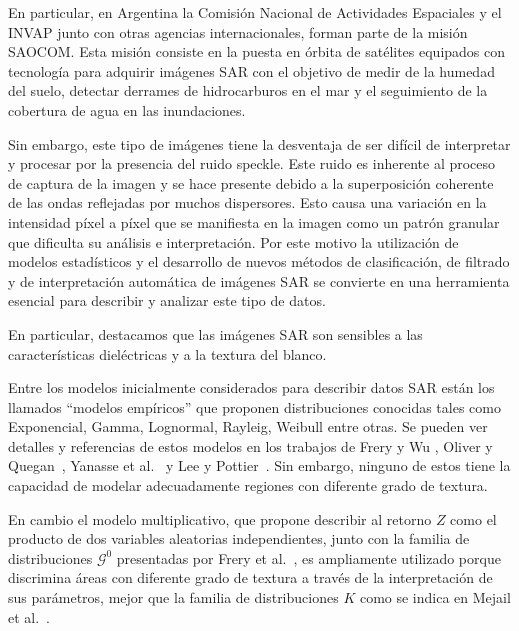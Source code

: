 \documentclass[11pt]{article}
\begin{document}
En particular, en Argentina la Comisión Nacional de Actividades Espaciales y el INVAP junto con otras agencias internacionales, forman parte de la misión SAOCOM. Esta misión consiste en la puesta en órbita de satélites equipados con tecnología para adquirir imágenes SAR con el objetivo de medir de la humedad del suelo, detectar derrames de hidrocarburos en el mar y el seguimiento de la cobertura de agua en las inundaciones. 


Sin embargo, este tipo de imágenes tiene la desventaja de ser difícil de interpretar y procesar por la presencia del ruido speckle. 
Este ruido es inherente al proceso de captura de la imagen y se hace presente debido a la superposición coherente de las ondas reflejadas por muchos dispersores. Esto causa una variación en la intensidad píxel a píxel que se manifiesta en la imagen como un patrón granular que dificulta su análisis e interpretación. 
Por este motivo la utilización de modelos estadísticos y el desarrollo de nuevos métodos de clasificación, de filtrado y de interpretación automática de imágenes SAR se convierte en una herramienta esencial para describir y analizar este tipo de datos.

En particular, destacamos que las imágenes SAR son sensibles a las características dieléctricas y a la textura del blanco.

Entre los modelos inicialmente considerados para describir datos SAR están los llamados ``modelos empíricos'' que proponen distribuciones conocidas tales como Exponencial, Gamma, Lognormal, Rayleig, Weibull entre otras. Se pueden ver detalles y referencias de estos modelos en los trabajos de Frery y Wu \cite{FreryLibro2019}, Oliver y Quegan~\cite{oliverquegan98}, Yanasse et al.~\cite{Yanasse93} y Lee y Pottier~\cite{Lee2009}. 
Sin embargo, ninguno de estos tiene la capacidad de modelar adecuadamente regiones con diferente grado de textura.
%

En cambio el modelo multiplicativo, que propone describir al retorno $Z$ como el producto de dos variables aleatorias independientes, junto con la familia de distribuciones $\mathcal{G}^0$ presentadas por Frery et al.~\cite{Frery97}, es ampliamente utilizado porque discrimina áreas con diferente grado de textura a través de la interpretación de sus parámetros, mejor que la familia de distribuciones $K$ como se indica en Mejail et al.~\cite{MejailJacoboFreryBustos:IJRS}.
\end{document}
